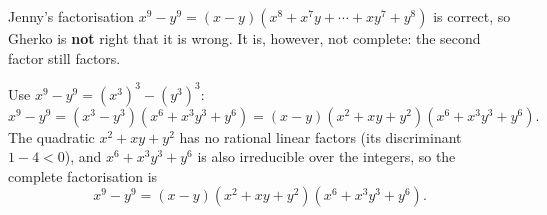 Jenny's factorisation $x^9-y^9=(x-y)\left(x^8+x^7y+\cdots+xy^7+y^8\right)$ is correct, so Gherko is \textbf{not} right that it is wrong. It is, however, not complete: the second factor still factors.

Use $x^9-y^9=(x^3)^3-(y^3)^3$:
\[
x^9-y^9=(x^3-y^3)\left(x^6+x^3y^3+y^6\right)=(x-y)\left(x^2+xy+y^2\right)\left(x^6+x^3y^3+y^6\right).
\]
The quadratic $x^2+xy+y^2$ has no rational linear factors (its discriminant $1-4<0$), and $x^6+x^3y^3+y^6$ is also irreducible over the integers, so the complete factorisation is
\[
\boxed{x^9-y^9=(x-y)\left(x^2+xy+y^2\right)\left(x^6+x^3y^3+y^6\right)}.
\]
